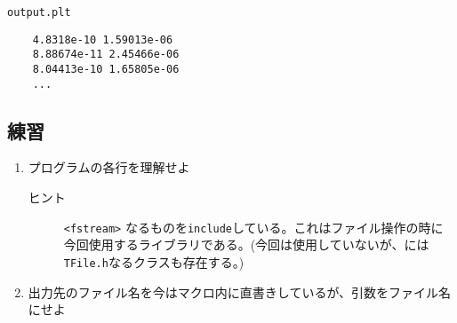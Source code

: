  \begin{itembox}{\texttt{output.plt}}
\begin{verbatim}
	4.8318e-10 1.59013e-06 
	8.88674e-11 2.45466e-06 
	8.04413e-10 1.65805e-06 
	...
\end{verbatim}
 \end{itembox}

  \subsection{練習}
 \begin{enumerate}
  \item プログラムの各行を理解せよ
	\begin{description}
	 \item[ヒント] \verb|<fstream>| なるものを\verb|include|している。これはファイル操作の時に今回使用するライブラリである。(今回は使用していないが、\ROOT には\verb|TFile.h|なるクラスも存在する。)
	\end{description}


  \item 出力先のファイル名を今はマクロ内に直書きしているが、引数をファイル名にせよ
 \end{enumerate}

